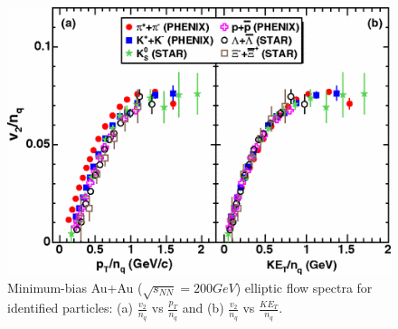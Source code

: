 	\begin{figure}[h]
	  \centering
	  \includegraphics[width=4.5in]{figures/v2Scaling2.png}
	  \caption{Minimum-bias Au+Au ($\sqrt{s_{NN}} = 200 GeV$) elliptic flow spectra for identified particles: (a) $\frac{v_{2}}{n_{q}}$ vs $\frac{p_{T}}{n_{q}}$ and (b) $\frac{v_{2}}{n_{q}}$ vs $\frac{KE_{T}}{n_{q}}$.\cite{2007PhRvL..98p2301A}}\label{fig:v2Scaling2}
	\end{figure}

